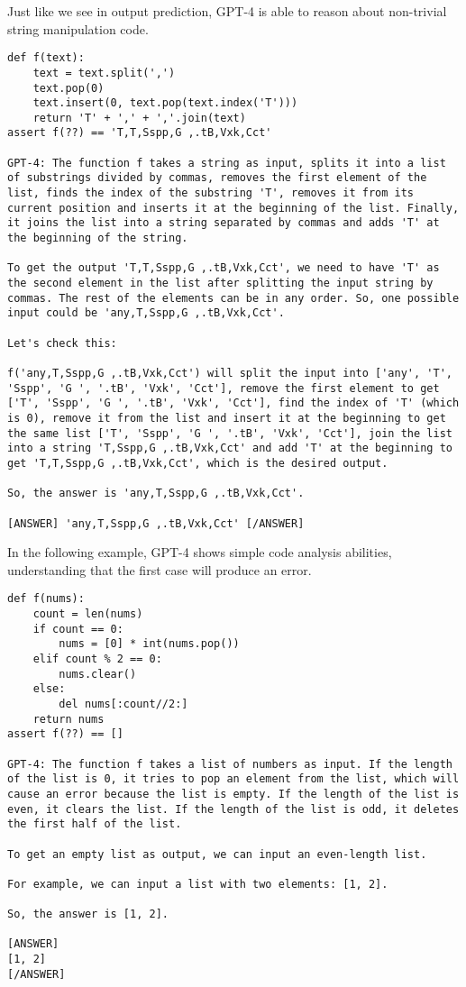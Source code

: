 Just like we see in output prediction, GPT-4 is able to reason about non-trivial string manipulation code.
\begin{lstlisting}
def f(text):
    text = text.split(',')
    text.pop(0)
    text.insert(0, text.pop(text.index('T')))
    return 'T' + ',' + ','.join(text)
assert f(??) == 'T,T,Sspp,G ,.tB,Vxk,Cct'

GPT-4: The function f takes a string as input, splits it into a list of substrings divided by commas, removes the first element of the list, finds the index of the substring 'T', removes it from its current position and inserts it at the beginning of the list. Finally, it joins the list into a string separated by commas and adds 'T' at the beginning of the string.

To get the output 'T,T,Sspp,G ,.tB,Vxk,Cct', we need to have 'T' as the second element in the list after splitting the input string by commas. The rest of the elements can be in any order. So, one possible input could be 'any,T,Sspp,G ,.tB,Vxk,Cct'.

Let's check this:

f('any,T,Sspp,G ,.tB,Vxk,Cct') will split the input into ['any', 'T', 'Sspp', 'G ', '.tB', 'Vxk', 'Cct'], remove the first element to get ['T', 'Sspp', 'G ', '.tB', 'Vxk', 'Cct'], find the index of 'T' (which is 0), remove it from the list and insert it at the beginning to get the same list ['T', 'Sspp', 'G ', '.tB', 'Vxk', 'Cct'], join the list into a string 'T,Sspp,G ,.tB,Vxk,Cct' and add 'T' at the beginning to get 'T,T,Sspp,G ,.tB,Vxk,Cct', which is the desired output.

So, the answer is 'any,T,Sspp,G ,.tB,Vxk,Cct'.

[ANSWER] 'any,T,Sspp,G ,.tB,Vxk,Cct' [/ANSWER]
\end{lstlisting}

In the following example, GPT-4 shows simple code analysis abilities, understanding that the first case will produce an error.
\begin{lstlisting}
def f(nums):
    count = len(nums)
    if count == 0:
        nums = [0] * int(nums.pop())
    elif count % 2 == 0:
        nums.clear()
    else:
        del nums[:count//2:]
    return nums
assert f(??) == []

GPT-4: The function f takes a list of numbers as input. If the length of the list is 0, it tries to pop an element from the list, which will cause an error because the list is empty. If the length of the list is even, it clears the list. If the length of the list is odd, it deletes the first half of the list. 

To get an empty list as output, we can input an even-length list. 

For example, we can input a list with two elements: [1, 2]. 

So, the answer is [1, 2].

[ANSWER]
[1, 2]
[/ANSWER]
\end{lstlisting}
